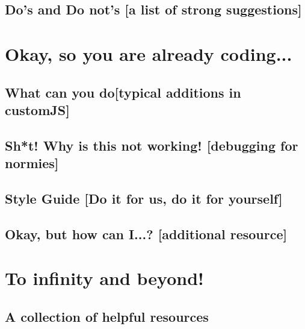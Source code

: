 \documentclass[11pt,a4paper,oldfontcommands]{memoir}
\begin{document}
\section{Do's and Do not's \small{[a list of strong suggestions]}}


\chapter{Okay, so you are already coding...}

\section{What can you do\small{[typical additions in customJS]}}


\section{Sh*t! Why is this not working! \small{[debugging for normies]}}


\section{Style Guide \small{[Do it for us, do it for yourself]}}



\section{Okay, but how can I...? \small{[additional resource]}}


\appendix

\chapter{To infinity and beyond!}
\section{A collection of helpful resources}




\end{document}
